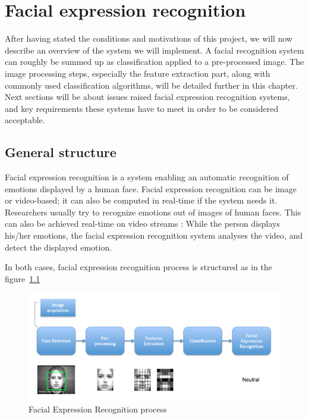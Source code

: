 \chapter{Facial expression recognition}

\noindent After having stated the conditions and motivations of this project, we will now describe an overview of the system we will implement. A facial recognition system can roughly be summed up as classification applied to a pre-processed image. The image processing steps, especially the feature extraction part, along with commonly used classification algorithms, will be detailed further in this chapter. Next sections will be about issues raised facial expression recognition systems, and key requirements these systems have to meet in order to be considered acceptable.

\section{General structure}

\vspace{\baselineskip}
\noindent Facial expression recognition is a system enabling an automatic recognition of emotions displayed by a human face. Facial expression recognition can be image or video-based; it can also be computed in real-time if the system needs it. Researchers usually try to recognize emotions out of images of human faces. This can also be achieved real-time on video streams : While the person displays his/her emotions, the facial expression recognition system analyses the video, and detect the displayed emotion.
\newline

\noindent In both cases, facial expression recognition process is structured as in the figure~\ref{facial_expression_recognition_process}
\newline

\begin{figure}[!h]
\begin{center}
\noindent \includegraphics[scale=0.6]{figures/facial_expression_recognition_process} 
\newline
\caption{Facial Expression Recognition process}
\label{facial_expression_recognition_process}
\end{center} 
\end{figure}

